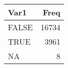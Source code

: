 \begin{table}[H]
\centering
\begin{tabular}[t]{lr}
\toprule
Var1 & Freq\\
\midrule
FALSE & 16734\\
TRUE & 3961\\
NA & 8\\
\bottomrule
\end{tabular}
\end{table}